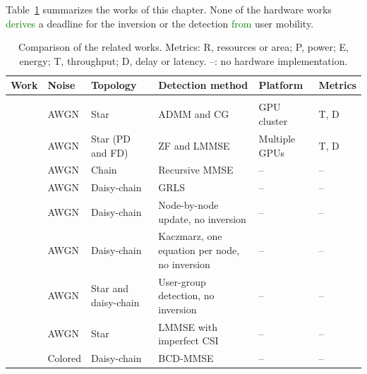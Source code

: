 Table~\ref{tab:comparativo-trabalhos} summarizes the works of this chapter. None of the hardware works \textcolor{GREEN}{derives} a deadline for the inversion or the detection \textcolor{GREEN}{from} user mobility.

\begin{table}[htbp]
\caption[Comparison of the related works.]{Comparison of the related works. Metrics: R, resources or area; P, power; E, energy; T, throughput; D, delay or latency. --: no hardware implementation.}
\label{tab:comparativo-trabalhos}
\vspace{4pt} %
\centering
\footnotesize
\renewcommand{\arraystretch}{1.15}
\setlength{\tabcolsep}{3pt}
\begin{tabular}{>{\raggedright\arraybackslash}p{2.9cm}>{\raggedright\arraybackslash}p{1.3cm}>{\raggedright\arraybackslash}p{2.0cm}>{\raggedright\arraybackslash}p{3.0cm}>{\raggedright\arraybackslash}p{2.8cm}>{\raggedright\arraybackslash}p{1.7cm}}
\toprule
\textbf{Work} & \textbf{Noise} & \textbf{Topology} & \textbf{Detection method} & \textbf{Platform} & \textbf{Metrics} \\
\midrule
\multicolumn{6}{l}{\textit{Decentralized algorithms}} \\
\cite{decentralized2017} & AWGN & Star & ADMM and CG & GPU cluster & T, D \\
\hline
\cite{jeon2019} & AWGN & Star (PD and FD) & ZF and LMMSE & Multiple GPUs & T, D \\
\hline
\cite{zheng2022} & AWGN & Chain & Recursive MMSE & -- & -- \\
\hline
\cite{chen2024grls} & AWGN & Daisy-chain & GRLS & -- & -- \\
\hline
\cite{rodriguezsanchez2020} & AWGN & Daisy-chain & Node-by-node update, no inversion & -- & -- \\
\hline
\cite{croisfelt2021} & AWGN & Daisy-chain & Kaczmarz, one equation per node, no inversion & -- & -- \\
\hline
\cite{li2023iotj} & AWGN & Star and daisy-chain & User-group detection, no inversion & -- & -- \\
\hline
\cite{zhuang2025} & AWGN & Star & LMMSE with imperfect CSI & -- & -- \\
\hline
\cite{zhao2021-globecom} & Colored & Daisy-chain & BCD-MMSE & -- & -- \\

\end{tabular}
\end{table}
